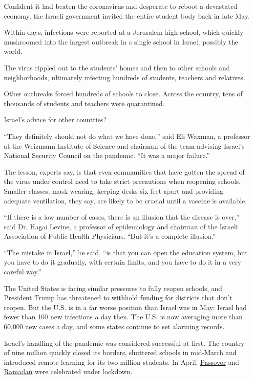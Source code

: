 Confident it had beaten the coronavirus and desperate to reboot a
devastated economy, the Israeli government invited the entire student
body back in late May.

Within days, infections were reported at a Jerusalem high school, which
quickly mushroomed into the largest outbreak in a single school in
Israel, possibly the world.

The virus rippled out to the students' homes and then to other schools
and neighborhoods, ultimately infecting hundreds of students, teachers
and relatives.

Other outbreaks forced hundreds of schools to close. Across the country,
tens of thousands of students and teachers were quarantined.

Israel's advice for other countries?

``They definitely should not do what we have done,'' said Eli Waxman, a
professor at the Weizmann Institute of Science and chairman of the team
advising Israel's National Security Council on the pandemic. ``It was a
major failure.''

The lesson, experts say, is that even communities that have gotten the
spread of the virus under control need to take strict precautions when
reopening schools. Smaller classes, mask wearing, keeping desks six feet
apart and providing adequate ventilation, they say, are likely to be
crucial until a vaccine is available.

``If there is a low number of cases, there is an illusion that the
disease is over,'' said Dr. Hagai Levine, a professor of epidemiology
and chairman of the Israeli Association of Public Health Physicians.
``But it's a complete illusion.''

``The mistake in Israel,'' he said, ``is that you can open the education
system, but you have to do it gradually, with certain limits, and you
have to do it in a very careful way.''

The United States is facing similar pressures to fully reopen schools,
and President Trump has threatened to withhold funding for districts
that don't reopen. But the U.S. is in a far worse position than Israel
was in May: Israel had fewer than 100 new infections a day then. The
U.S. is now averaging more than 60,000 new cases a day, and some states
continue to set alarming records.

Israel's handling of the pandemic was considered successful at first.
The country of nine million quickly closed its borders, shuttered
schools in mid-March and introduced remote learning for its two million
students. In April,
\href{https://www.nytimes.com/2020/04/07/world/middleeast/coronavirus-passover-israel.html?searchResultPosition=1}{Passover}
and
\href{https://www.nytimes.com/2020/05/15/world/middleeast/ramadan-coronavirus-al-aqsa.html?searchResultPosition=1}{Ramadan}
were celebrated under lockdown.

